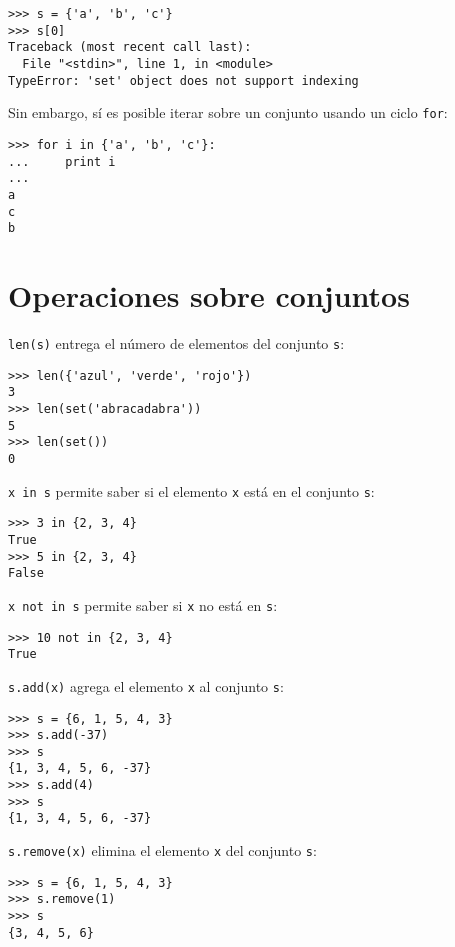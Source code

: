 \begin{lstlisting}
>>> s = {'a', 'b', 'c'}
>>> s[0]
Traceback (most recent call last):
  File "<stdin>", line 1, in <module>
TypeError: 'set' object does not support indexing
\end{lstlisting}

Sin embargo, sí es posible iterar sobre un conjunto usando un ciclo
\lstinline!for!:

\begin{lstlisting}
>>> for i in {'a', 'b', 'c'}:
...     print i
...
a
c
b
\end{lstlisting}

\section{Operaciones sobre conjuntos}

\lstinline!len(s)! entrega el número de elementos del conjunto
\lstinline!s!:

\begin{lstlisting}
>>> len({'azul', 'verde', 'rojo'})
3
>>> len(set('abracadabra'))
5
>>> len(set())
0
\end{lstlisting}

\lstinline!x in s! permite saber si el elemento \lstinline!x! está en el
conjunto \lstinline!s!:

\begin{lstlisting}
>>> 3 in {2, 3, 4}
True
>>> 5 in {2, 3, 4}
False
\end{lstlisting}

\lstinline!x not in s! permite saber si \lstinline!x! no está en
\lstinline!s!:

\begin{lstlisting}
>>> 10 not in {2, 3, 4}
True
\end{lstlisting}

\lstinline!s.add(x)! agrega el elemento \lstinline!x! al conjunto
\lstinline!s!:

\begin{lstlisting}
>>> s = {6, 1, 5, 4, 3}
>>> s.add(-37)
>>> s
{1, 3, 4, 5, 6, -37}
>>> s.add(4)
>>> s
{1, 3, 4, 5, 6, -37}
\end{lstlisting}

\lstinline!s.remove(x)! elimina el elemento \lstinline!x! del conjunto
\lstinline!s!:

\begin{lstlisting}
>>> s = {6, 1, 5, 4, 3}
>>> s.remove(1)
>>> s
{3, 4, 5, 6}
\end{lstlisting}

